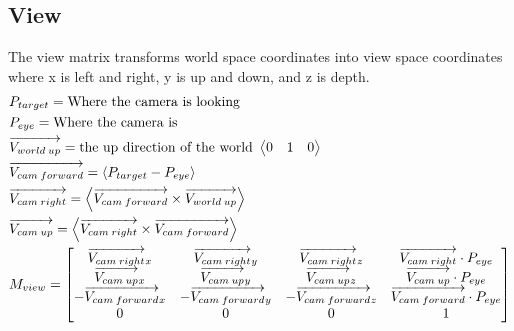 \documentclass[12pt]{article}
\begin{document}
\subsection{View}
The view matrix transforms world space coordinates into view space coordinates where x is left and right, y is up and down, and z is depth.
\begin{gather*}\begin{align}
		&P_{target} = \text{Where the camera is looking} \notag\\
		&P_{eye} = \text{Where the camera is} \notag\\
		&\overrightarrow{V_{world\hspace{0.2em}up}} = \text{the up direction of the world }\left\langle \begin{matrix}0&1&0\end{matrix} \right\rangle \notag\\
		&\overrightarrow{V_{cam\hspace{0.2em}forward}} = \left\langle P_{target}-P_{eye} \right\rangle \notag\\
		&\overrightarrow{V_{cam\hspace{0.2em}right}} = \left\langle \overrightarrow{V_{cam\hspace{0.2em}forward}}\times  \overrightarrow{V_{world\hspace{0.2em}up}}\right\rangle \notag\\
		&\overrightarrow{V_{cam\hspace{0.2em}up}} = \left\langle \overrightarrow{V_{cam\hspace{0.2em}right}}\times  \overrightarrow{V_{cam\hspace{0.2em}forward}}\right\rangle \notag\\
		&M_{view}= 
		\begin{bmatrix}
			\overrightarrow{V_{cam\hspace{0.2em}right}}_x&\overrightarrow{V_{cam\hspace{0.2em}right}}_y&\overrightarrow{V_{cam\hspace{0.2em}right}}_z&\overrightarrow{V_{cam\hspace{0.2em}right}}\cdot P_{eye}\\
			\overrightarrow{V_{cam\hspace{0.2em}up}}_x&\overrightarrow{V_{cam\hspace{0.2em}up}}_y&\overrightarrow{V_{cam\hspace{0.2em}up}}_z&\overrightarrow{V_{cam\hspace{0.2em}up}}\cdot P_{eye}\\
			-\overrightarrow{V_{cam\hspace{0.2em}forward}}_x&-\overrightarrow{V_{cam\hspace{0.2em}forward}}_y&-\overrightarrow{V_{cam\hspace{0.2em}forward}}_z&\overrightarrow{V_{cam\hspace{0.2em}forward}}\cdot P_{eye}\\
			0&0&0&1
		\end{bmatrix}
\end{align}\end{gather*}
\end{document}
